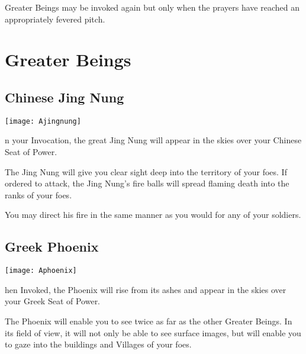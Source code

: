 Greater Beings may be invoked again but only when the prayers have reached an appropriately fevered pitch.

\clearpage %

\section{\textsf{Greater Beings}}

\subsection{\textsf{Chinese Jing Nung}}


\begin{center}
    \texttt{[image: Ajingnung]}
\end{center}

n your Invocation, the great Jing Nung will appear in the skies over your Chinese Seat of Power.

The Jing Nung will give you clear sight deep into the territory of your foes. If ordered to attack, the Jing Nung’s fire balls will spread flaming death into the ranks of your foes.


You may direct his fire in the same manner as you would for any of your soldiers.

\subsection{\textsf{Greek Phoenix}}


\begin{center}
    \texttt{[image: Aphoenix]}
\end{center}


hen Invoked, the Phoenix will rise from its ashes and appear in the skies over your Greek Seat of Power.

The Phoenix will enable you to see twice as far as the other Greater Beings. In its field of view, it will not only be able to see surface images, but will enable you to gaze into the buildings and Villages of your foes.

